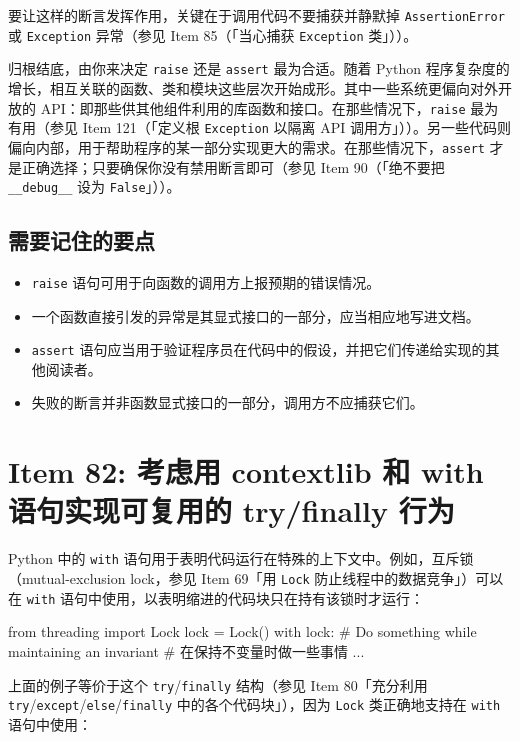 要让这样的断言发挥作用，关键在于调用代码不要捕获并静默掉 \texttt{AssertionError} 或 \texttt{Exception} 异常（参见 Item 85（「当心捕获 \texttt{Exception} 类」））。

归根结底，由你来决定 \texttt{raise} 还是 \texttt{assert} 最为合适。随着 Python 程序复杂度的增长，相互关联的函数、类和模块这些层次开始成形。其中一些系统更偏向对外开放的 API：即那些供其他组件利用的库函数和接口。在那些情况下，\texttt{raise} 最为有用（参见 Item 121（「定义根 \texttt{Exception} 以隔离 API 调用方」））。另一些代码则偏向内部，用于帮助程序的某一部分实现更大的需求。在那些情况下，\texttt{assert} 才是正确选择；只要确保你没有禁用断言即可（参见 Item 90（「绝不要把 \texttt{\_\_debug\_\_} 设为 \texttt{False}」））。

\subsection{需要记住的要点}

\begin{itemize}
\item \texttt{raise} 语句可用于向函数的调用方上报预期的错误情况。
\item 一个函数直接引发的异常是其显式接口的一部分，应当相应地写进文档。
\item \texttt{assert} 语句应当用于验证程序员在代码中的假设，并把它们传递给实现的其他阅读者。
\item 失败的断言并非函数显式接口的一部分，调用方不应捕获它们。
\end{itemize}

\section{Item 82: 考虑用 contextlib 和 with 语句实现可复用的 try/finally 行为}

Python 中的 \texttt{with} 语句用于表明代码运行在特殊的上下文中。例如，互斥锁（mutual-exclusion lock，参见 Item 69「用 \texttt{Lock} 防止线程中的数据竞争」）可以在 \texttt{with} 语句中使用，以表明缩进的代码块只在持有该锁时才运行：

\begin{codebox}[python]
from threading import Lock
lock = Lock()
with lock:
    # Do something while maintaining an invariant
    # 在保持不变量时做一些事情
    ...
\end{codebox}

上面的例子等价于这个 \texttt{try}/\texttt{finally} 结构（参见 Item 80「充分利用 \texttt{try}/\texttt{except}/\texttt{else}/\texttt{finally} 中的各个代码块」），因为 \texttt{Lock} 类正确地支持在 \texttt{with} 语句中使用：

